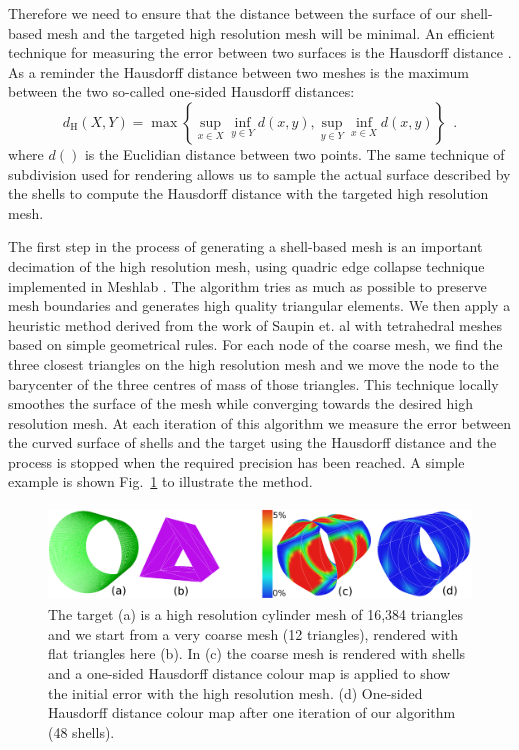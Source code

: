 \documentclass{llncs}
\begin{document}
Therefore we need to ensure that the distance between the surface of our shell-based mesh and the targeted high resolution mesh will be minimal. An efficient technique for measuring the error between two surfaces is the Hausdorff distance \cite{Klein96}. As a reminder the Hausdorff distance between two meshes is the maximum between the two so-called one-sided Hausdorff distances:
\begin{equation}
d_{\mathrm{H}}(X,Y) = \max \left\{ \sup_{x \in X} \inf_{y \in Y} d(x,y), \sup_{y \in Y} \inf_{x \in X} d(x,y) \right\} \enspace .
\end{equation}
where $d()$ is the Euclidian distance between two points. The same technique of subdivision used for rendering allows us to sample the actual surface described by the shells to compute the Hausdorff distance with the targeted high resolution mesh. 

The first step in the process of generating a shell-based mesh is an important decimation of the high resolution mesh, using quadric edge collapse technique implemented in Meshlab \cite{Meshlab}. The algorithm tries as much as possible to preserve mesh boundaries and generates high quality triangular elements. We then apply a heuristic method derived from the work of Saupin et. al \cite{Saupin07} with tetrahedral meshes based on simple geometrical rules. For each node of the coarse mesh, we find the three closest triangles on the high resolution mesh and we move the node to the barycenter of the three centres of mass of those triangles. This technique locally smoothes the surface of the mesh while converging towards the desired high resolution mesh. At each iteration of this algorithm we measure the error between the curved surface of shells and the target using the Hausdorff distance and the process is stopped when the required precision has been reached. A simple example is shown Fig.~\ref{fig-cylinder} to illustrate the method. 
\begin{figure}
\centering
\includegraphics[height=2.5cm]{images/exampleCylinder}
\caption {The target (a) is a high resolution cylinder mesh of 16,384 triangles and we start from a very coarse mesh (12 triangles), rendered with flat triangles here (b). In (c) the coarse mesh is rendered with shells and a one-sided Hausdorff distance colour map is applied to show the initial error with the high resolution mesh. (d) One-sided Hausdorff distance colour map after one iteration of our algorithm (48 shells).}
\label{fig-cylinder}
\end{figure}
\end{document}
